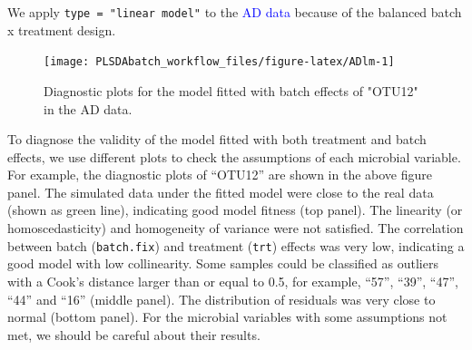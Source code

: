 \documentclass[
]{book}
\newenvironment{Shaded}{\begin{snugshade}}{\end{snugshade}}
\newcommand{\AttributeTok}[1]{\textcolor[rgb]{0.77,0.63,0.00}{#1}}
\newcommand{\CommentTok}[1]{\textcolor[rgb]{0.56,0.35,0.01}{\textit{#1}}}
\newcommand{\ControlFlowTok}[1]{\textcolor[rgb]{0.13,0.29,0.53}{\textbf{#1}}}
\newcommand{\DecValTok}[1]{\textcolor[rgb]{0.00,0.00,0.81}{#1}}
\newcommand{\FunctionTok}[1]{\textcolor[rgb]{0.00,0.00,0.00}{#1}}
\newcommand{\NormalTok}[1]{#1}
\newcommand{\OtherTok}[1]{\textcolor[rgb]{0.56,0.35,0.01}{#1}}
\newcommand{\SpecialCharTok}[1]{\textcolor[rgb]{0.00,0.00,0.00}{#1}}
\newcommand{\StringTok}[1]{\textcolor[rgb]{0.31,0.60,0.02}{#1}}
\begin{document}
We apply \texttt{type\ =\ "linear\ model"} to the \textcolor{blue}{AD data} because of the balanced batch x treatment design.

\begin{Shaded}
\end{Shaded}

\begin{figure}

{\centering \texttt{[image: PLSDAbatch\_workflow\_files/figure-latex/ADlm-1]} 

}

\caption{Diagnostic plots for the model fitted with batch effects of "OTU12" in the AD data.}\label{fig:ADlm}
\end{figure}

To diagnose the validity of the model fitted with both treatment and batch effects, we use different plots to check the assumptions of each microbial variable. For example, the diagnostic plots of ``OTU12'' are shown in the above figure panel. The simulated data under the fitted model were close to the real data (shown as green line), indicating good model fitness (top panel). The linearity (or homoscedasticity) and homogeneity of variance were not satisfied. The correlation between batch (\texttt{batch.fix}) and treatment (\texttt{trt}) effects was very low, indicating a good model with low collinearity. Some samples could be classified as outliers with a Cook's distance larger than or equal to 0.5, for example, ``57'', ``39'', ``47'', ``44'' and ``16'' (middle panel). The distribution of residuals was very close to normal (bottom panel). For the microbial variables with some assumptions not met, we should be careful about their results.
\end{document}
